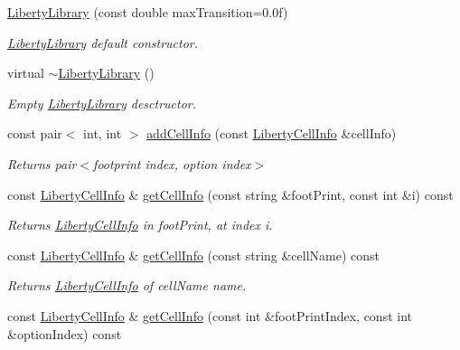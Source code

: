 \begin{DoxyCompactItemize}
\item 
\hyperlink{classLibertyLibrary_a3b7513ef68e791245f60e16f6b4ee5d4}{Liberty\-Library} (const double max\-Transition=0.\-0f)
\begin{DoxyCompactList}\small\item\em \hyperlink{classLibertyLibrary}{Liberty\-Library} default constructor. \end{DoxyCompactList}\item 
virtual \hyperlink{classLibertyLibrary_ade99b2247c7d5eb9ef885bc4ec57091d}{$\sim$\-Liberty\-Library} ()
\begin{DoxyCompactList}\small\item\em Empty \hyperlink{classLibertyLibrary}{Liberty\-Library} desctructor. \end{DoxyCompactList}\item 
const pair$<$ int, int $>$ \hyperlink{classLibertyLibrary_a4d9ec0ea6af3949878d9b14042e761e6}{add\-Cell\-Info} (const \hyperlink{structLibertyCellInfo}{Liberty\-Cell\-Info} \&cell\-Info)
\begin{DoxyCompactList}\small\item\em Returns pair$<$footprint index, option index$>$ \end{DoxyCompactList}\item 
const \hyperlink{structLibertyCellInfo}{Liberty\-Cell\-Info} \& \hyperlink{classLibertyLibrary_a917ae50f0af17b1b68be754f1ae6dd07}{get\-Cell\-Info} (const string \&foot\-Print, const int \&i) const 
\begin{DoxyCompactList}\small\item\em Returns \hyperlink{structLibertyCellInfo}{Liberty\-Cell\-Info} in foot\-Print, at index i. \end{DoxyCompactList}\item 
const \hyperlink{structLibertyCellInfo}{Liberty\-Cell\-Info} \& \hyperlink{classLibertyLibrary_a57c64ca6abd02f1e549eeb25178724c9}{get\-Cell\-Info} (const string \&cell\-Name) const 
\begin{DoxyCompactList}\small\item\em Returns \hyperlink{structLibertyCellInfo}{Liberty\-Cell\-Info} of cell\-Name name. \end{DoxyCompactList}\item 
const \hyperlink{structLibertyCellInfo}{Liberty\-Cell\-Info} \& \hyperlink{classLibertyLibrary_a227638e4b3a4b00faa659c45e20c0aaa}{get\-Cell\-Info} (const int \&foot\-Print\-Index, const int \&option\-Index) const 

\end{DoxyCompactItemize}
